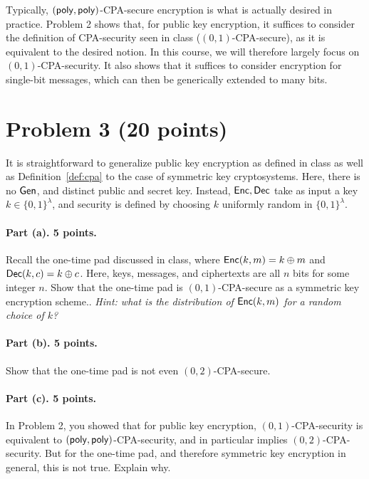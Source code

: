 \documentclass{article}
\begin{document}
\begin{remark}Typically, $({\sf poly},{\sf poly})$-CPA-secure encryption is what is actually desired in practice. Problem 2 shows that, for public key encryption, it suffices to consider the definition of CPA-security seen in class ($(0,1)$-CPA-secure), as it is equivalent to the desired notion. In this course, we will therefore largely focus on $(0,1)$-CPA-security. It also shows that it suffices to consider encryption for single-bit messages, which can then be generically extended to many bits.
\end{remark}


\section{Problem 3 (20 points)}

It is straightforward to generalize public key encryption as defined in class as well as Definition~\ref{def:cpa} to the case of symmetric key cryptosystems. Here, there is no ${\sf Gen}$, and distinct public and secret key. Instead, ${\sf Enc},{\sf Dec}$ take as input a key $k\in\{0,1\}^\lambda$, and security is defined by choosing $k$ uniformly random in $\{0,1\}^\lambda$.

\paragraph{Part (a). 5 points.} Recall the one-time pad discussed in class, where ${\sf Enc}(k,m)=k\oplus m$ and ${\sf Dec}(k,c)=k\oplus c$. Here, keys, messages, and ciphertexts are all $n$ bits for some integer $n$. Show that the one-time pad is $(0,1)$-CPA-secure as a symmetric key encryption scheme.. \emph{Hint: what is the distribution of ${\sf Enc}(k,m)$ for a random choice of $k$?}


\paragraph{Part (b). 5 points.} Show that the one-time pad is not even $(0,2)$-CPA-secure.

\paragraph{Part (c). 5 points.} In Problem 2, you showed that for public key encryption, $(0,1)$-CPA-security is equivalent to $({\sf poly},{\sf poly})$-CPA-security, and in particular implies $(0,2)$-CPA-security. But for the one-time pad, and therefore symmetric key encryption in general, this is not true. Explain why.
\end{document}
